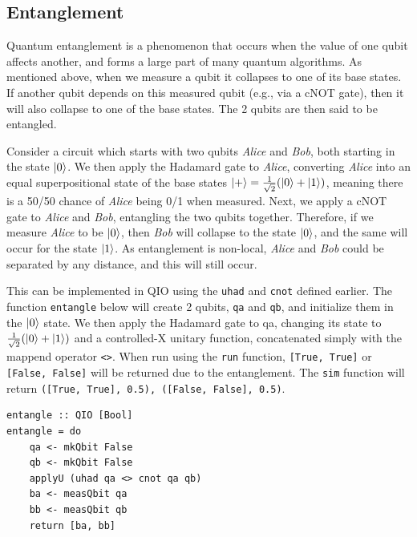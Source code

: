\documentclass[a4paper,10pt, titlepage, twoside]{article}
\begin{document}
\subsection{Entanglement}
Quantum entanglement is a phenomenon that occurs when the value of one qubit affects another, and forms a large part of many quantum algorithms. As mentioned above, when we measure a qubit it collapses to one of its base states. If another qubit depends on this measured qubit (e.g., via a cNOT gate), then it will also collapse to one of the base states. The 2 qubits are then said to be entangled. \par
Consider a circuit which starts with two qubits \textit{Alice} and \textit{Bob}, both starting in the state $\ket{0}$. We then apply the Hadamard gate to \textit{Alice}, converting \textit{Alice} into an equal superpositional state of the base states $\ket{+} = \frac{1}{\sqrt{2}}(\ket{0} + \ket{1})$, meaning there is a 50/50 chance of \textit{Alice} being 0/1 when measured. Next, we apply a cNOT gate to \textit{Alice} and \textit{Bob}, entangling the two qubits together. Therefore, if we measure \textit{Alice} to be $\ket{0}$, then \textit{Bob} will collapse to the state $\ket{0}$, and the same will occur for the state $\ket{1}$. As entanglement is non-local, \textit{Alice} and \textit{Bob} could be separated by any distance, and this will still occur.\par
This can be implemented in QIO using the \texttt{uhad} and \texttt{cnot} defined earlier. The function \texttt{entangle} below will create 2 qubits, \texttt{qa} and \texttt{qb}, and initialize them in the $\ket{0}$ state. We then apply the Hadamard gate to qa, changing its state to $\frac{1}{\sqrt{2}}(\ket{0} + \ket{1})$ and a controlled-X unitary function, concatenated simply with the mappend operator \texttt{<>}. When run using the \texttt{run} function, \texttt{[True, True]} or \texttt{[False, False]} will be returned due to the entanglement. The \texttt{sim} function will return \texttt{([True, True], 0.5), ([False, False], 0.5)}.\par
\begin{verbatim}
entangle :: QIO [Bool]
entangle = do
    qa <- mkQbit False
    qb <- mkQbit False
    applyU (uhad qa <> cnot qa qb)
    ba <- measQbit qa
    bb <- measQbit qb
    return [ba, bb]
\end{verbatim}
\end{document}
